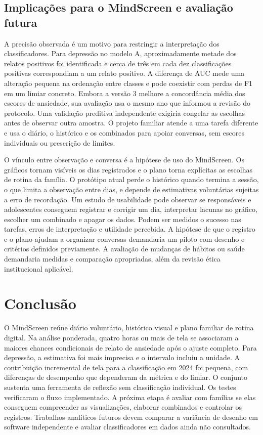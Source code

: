 ﻿\documentclass[12pt]{article}
\begin{document}
\subsection{Implicações para o MindScreen e avaliação futura}
A precisão observada é um motivo para restringir a interpretação dos classificadores. Para depressão no modelo A, aproximadamente metade dos relatos positivos foi identificada e cerca de três em cada dez classificações positivas correspondiam a um relato positivo. A diferença de AUC mede uma alteração pequena na ordenação entre classes e pode coexistir com perdas de F1 em um limiar concreto. Embora a versão 3 melhore a concordância média dos escores de ansiedade, sua avaliação usa o mesmo ano que informou a revisão do protocolo. Uma validação preditiva independente exigiria congelar as escolhas antes de observar outra amostra. O projeto familiar atende a uma tarefa diferente e usa o diário, o histórico e os combinados para apoiar conversas, sem escores individuais ou prescrição de limites.

O vínculo entre observação e conversa é a hipótese de uso do MindScreen. Os gráficos tornam visíveis os dias registrados e o plano torna explícitas as escolhas de rotina da família. O protótipo atual perde o histórico quando termina a sessão, o que limita a observação entre dias, e depende de estimativas voluntárias sujeitas a erro de recordação. Um estudo de usabilidade pode observar se responsáveis e adolescentes conseguem registrar e corrigir um dia, interpretar lacunas no gráfico, escolher um combinado e apagar os dados. Podem ser medidos o sucesso nas tarefas, erros de interpretação e utilidade percebida. A hipótese de que o registro e o plano ajudam a organizar conversas demandaria um piloto com desenho e critérios definidos previamente. A avaliação de mudanças de hábitos ou saúde demandaria medidas e comparação apropriadas, além da revisão ética institucional aplicável.

\section{Conclusão}
O MindScreen reúne diário voluntário, histórico visual e plano familiar de rotina digital. Na análise ponderada, quatro horas ou mais de tela se associaram a maiores chances condicionais de relato de ansiedade após o ajuste completo. Para depressão, a estimativa foi mais imprecisa e o intervalo incluiu a unidade. A contribuição incremental de tela para a classificação em 2024 foi pequena, com diferenças de desempenho que dependeram da métrica e do limiar. O conjunto sustenta uma ferramenta de reflexão sem classificação individual. Os testes verificaram o fluxo implementado. A próxima etapa é avaliar com famílias se elas conseguem compreender as visualizações, elaborar combinados e controlar os registros. Trabalhos analíticos futuros devem comparar a variância de desenho em software independente e avaliar classificadores em dados ainda não consultados.



\end{document}

